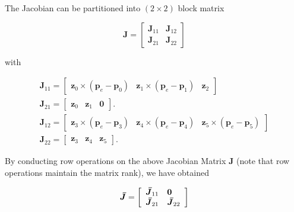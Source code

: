\documentclass[10pt]{article}
\begin{document}
The Jacobian can be partitioned into $(2 \times 2)$ block matrix

$$
\boldsymbol{J}=\left[\begin{array}{ll}
\boldsymbol{J}_{11} & \boldsymbol{J}_{12} \\
\boldsymbol{J}_{21} & \boldsymbol{J}_{22}
\end{array}\right]
$$

with 

$$
\begin{gathered}
\boldsymbol{J}_{11}=\left[\begin{array}{ccc}
\boldsymbol{z}_{0} \times\left(\boldsymbol{p}_{e}-\boldsymbol{p}_{0}\right) & \boldsymbol{z}_{1} \times\left(\boldsymbol{p}_{e}-\boldsymbol{p}_{1}\right) & \boldsymbol{z}_{2} 
\end{array}\right] \\
\boldsymbol{J}_{21}=\left[\begin{array}{lll}
\boldsymbol{z}_{0} & \boldsymbol{z}_{1} & \boldsymbol{0}
\end{array}\right] .\\
\boldsymbol{J}_{12}=\left[\begin{array}{ccc}
\boldsymbol{z}_{3} \times\left(\boldsymbol{p}_{e}-\boldsymbol{p}_{3}\right) & \boldsymbol{z}_{4} \times\left(\boldsymbol{p}_{e}-\boldsymbol{p}_{4}\right) & \boldsymbol{z}_{5} \times\left(\boldsymbol{p}_{e}-\boldsymbol{p}_{5}\right)
\end{array}\right] \\
\boldsymbol{J}_{22}=\left[\begin{array}{lll}
\boldsymbol{z}_{3} & \boldsymbol{z}_{4} & \boldsymbol{z}_{5}
\end{array}\right] .
\end{gathered}
$$

By conducting row operations on the above Jacobian Matrix $\boldsymbol{J}$ (note that row operations maintain the matrix rank), we have obtained

$$
\boldsymbol{\Bar{J}}=\left[\begin{array}{ll}
\boldsymbol{\bar{J}}_{11} & \boldsymbol{0} \\
\boldsymbol{\bar{J}}_{21} & \boldsymbol{\bar{J}}_{22}
\end{array}\right]
$$
\end{document}
